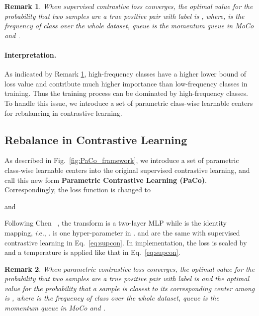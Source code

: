 \documentclass[10pt,twocolumn,letterpaper]{article}
\newtheorem{theorem}{Remark}
\begin{document}
\begin{theorem}
	\label{thm:01_supcon}
	When supervised contrastive loss converges, the optimal value for the probability that two samples are a true positive pair with label  is , where,  is the frequency of class  over the whole dataset, {\it queue} is the momentum  {\it queue} in MoCo \cite{DBLP:conf/cvpr/He0WXG20, DBLP:journals/corr/abs-2003-04297} and .
\end{theorem}    

\paragraph{Interpretation.} As indicated by Remark \ref{thm:01_supcon}, high-frequency classes have a higher lower bound of loss value and contribute much higher importance than low-frequency classes in training. Thus the training process can be dominated by high-frequency classes. To handle this issue, we introduce a set of parametric class-wise learnable centers for rebalancing in contrastive learning.

\subsection{Rebalance in Contrastive Learning}
\label{Sec:PaCo}
As described in Fig.~\ref{fig:PaCo_framework}, we introduce a set of parametric class-wise learnable centers  into the original supervised contrastive learning, and call this new form {\bf Parametric Contrastive Learning (PaCo)}. Correspondingly, the loss function is changed to

\iffalse

\fi

and


Following Chen \etal~\cite{DBLP:journals/corr/abs-2003-04297}, the transform  is a two-layer MLP while  is the identity mapping, {\textit i.e.}, .  is one hyper-parameter in .  and  are the same with supervised contrastive learning in Eq.~\eqref{eq:supcon}. In implementation, the loss is scaled by  and a temperature  is applied like that in Eq.~\eqref{eq:supcon}.

\begin{theorem}
	\label{thm:02_pcl}
	When parametric contrastive loss converges, the optimal value for the probability that two samples are a true positive pair with label  is  and the optimal value for the probability that a sample is closest to its corresponding center  among  is , where  is the frequency of class  over the whole dataset, {\it queue} is the momentum  {queue} in MoCo \cite{DBLP:conf/cvpr/He0WXG20, DBLP:journals/corr/abs-2003-04297} and .
\end{theorem}  
\end{document}
